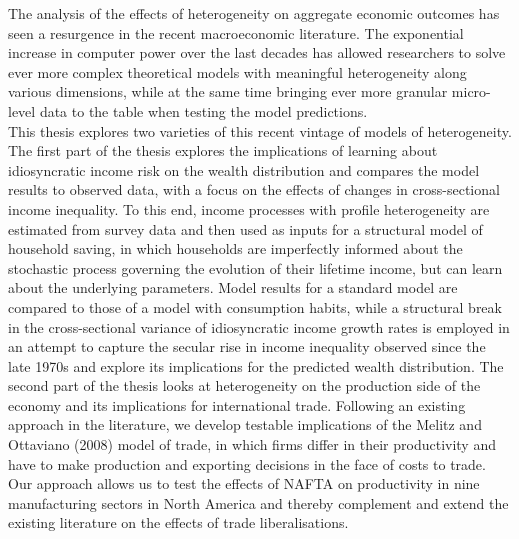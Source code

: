 \thispagestyle{plain}

The analysis of the effects of heterogeneity on aggregate economic outcomes has seen a resurgence in the recent macroeconomic literature. The exponential increase in computer power over the last decades has allowed researchers to solve ever more complex theoretical models with meaningful heterogeneity along various dimensions, while at the same time bringing ever more granular micro-level data to the table when testing the model predictions. \\
This thesis explores two varieties of this recent vintage of models of heterogeneity. The first part of the thesis explores the implications of learning about idiosyncratic income risk on the wealth distribution and compares the model results to observed data, with a focus on the effects of changes in cross-sectional income inequality. To this end, income processes with profile heterogeneity are estimated from survey data and then used as inputs for a structural model of household saving, in which households are imperfectly informed about the stochastic process governing the evolution of their lifetime income, but can learn about the underlying parameters. Model results for a standard model are compared to those of a model with consumption habits, while a structural break in the cross-sectional variance of idiosyncratic income growth rates is employed in an attempt to capture the secular rise in income inequality observed since the late 1970s and explore its implications for the predicted wealth distribution. 
The second part of the thesis looks at heterogeneity on the production side of the economy and its implications for international trade. Following an existing approach in the literature, we develop testable implications of the Melitz and Ottaviano (2008) model of trade, in which firms differ in their productivity and have to make production and exporting decisions in the face of costs to trade. Our approach allows us to test the effects of NAFTA on productivity in nine manufacturing sectors in North America and thereby complement and extend the existing literature on the effects of trade liberalisations.